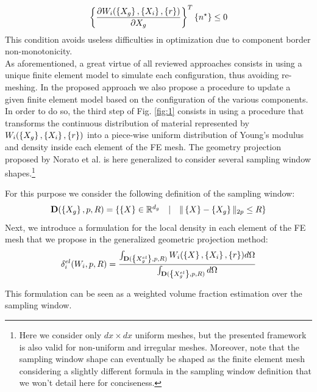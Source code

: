  \begin{equation}
     \left\{{\frac{\partial W_i(\left\{{X_g}\right\},\left\{{X_i}\right\},\left\{{r}\right\})}{\partial X_g}}\right\}^T \left\{{n^\star}\right\}  \leq 0
 \end{equation}
 This condition avoids useless difficulties in optimization due to component border non-monotonicity.\\
 As aforementioned, a great virtue of all reviewed approaches consists in using a unique finite element model to simulate each configuration, thus avoiding re-meshing. In the proposed approach we also propose a procedure to update a given finite element model based on the configuration of the various components. In order to do so, the third step of Fig. \ref{fig:1} consists in using a procedure that transforms the continuous distribution of material represented by $W_i(\left\{{X_g}\right\},\left\{{X_i}\right\},\left\{{r}\right\})$ into a piece-wise uniform distribution of Young's modulus and density inside each element of the FE mesh. The geometry projection proposed by Norato et al. \cite{norato2004geometry} is here generalized to consider several sampling window shapes.\footnote{Here we consider only $dx\times dx$ uniform meshes, but the presented framework is also valid for non-uniform and irregular meshes. Moreover, note that the sampling window shape can eventually be shaped as the finite element mesh considering a slightly different formula in the sampling window definition that we won't detail here for conciseness.}
 
 For this purpose we consider the following definition of the sampling window:
 \begin{equation}
 \begin{array}{ccc}
     \mathbf{D}(\left\{{X_g}\right\},p,R)=\lbrace \left\{{X}\right\}\in \mathbb{R}^{d_g} & | & \|\left\{{X}\right\}-\left\{{X_g}\right\}\|_{2p} \leq R  \rbrace
     \end{array}
 \end{equation}
 Next, we introduce a formulation for the local density in each element of the FE mesh that we propose in the generalized geometric projection method: 
 \begin{equation}
 \label{eq. ro}
     \delta_i^{el}(W_i,p,R)=\frac{\int_{\mathbf{D}(\left\{{X_g^{el}}\right\},p,R)}{W_i(\left\{{X}\right\},\left\{{X_i}\right\},\left\{{r}\right\})d\Omega}}{\int_{\mathbf{D}(\left\{{X^{el}_g}\right\},p,R)}{d\Omega}}
 \end{equation}

 This formulation can be seen as a weighted volume fraction estimation over the sampling window.
 
